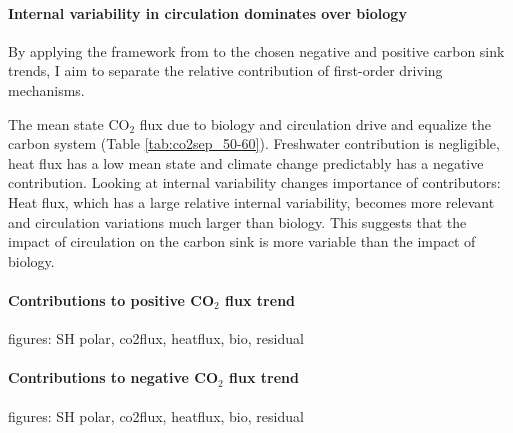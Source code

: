 \paragraph{Internal variability in circulation dominates over biology}
By applying the framework from \citep{Lauderdale2016a} to the chosen negative and positive carbon sink trends, I aim to separate the relative contribution of first-order driving mechanisms. 

The mean state CO$_2$ flux due to biology and circulation drive and equalize the carbon system (Table \ref{tab:co2sep_50-60}). Freshwater contribution is negligible, heat flux has a low mean state and climate change predictably has a negative contribution. Looking at internal variability changes importance of contributors: Heat flux, which has a large relative internal variability, becomes more relevant and circulation variations much larger than biology. This suggests that the impact of circulation on the carbon sink is more variable than the impact of biology.

\paragraph{Contributions to positive CO$_2$ flux trend} %

figures: SH polar, co2flux, heatflux, bio, residual

\paragraph{Contributions to negative CO$_2$ flux trend} %


figures: SH polar, co2flux, heatflux, bio, residual

